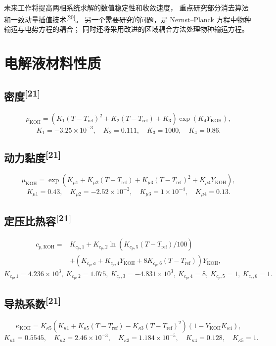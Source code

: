 \documentclass[UTF8,zihao=-4,fontset=fandol]{ctexart}
\begin{document}
未来工作将提高两相系统求解的数值稳定性和收敛速度，
重点研究部分消去算法和一致动量插值技术\textsuperscript{[20]}。
另一个需要研究的问题，是 Nernst--Planck 方程中物种输运与电势方程的耦合；
同时还将采用改进的区域耦合方法处理物种输运方程。

\appendix
\section{电解液材料性质}

\subsection{密度\textsuperscript{[21]}}
\[
\rho_{\mathrm{KOH}}=
\left(K_1(T-T_{\mathrm{ref}})^2+K_2(T-T_{\mathrm{ref}})+K_3\right)
\exp(K_4Y_{\mathrm{KOH}}),
\]
\[
K_1=-3.25\times10^{-3},\quad K_2=0.111,\quad K_3=1000,\quad K_4=0.86.
\]

\subsection{动力黏度\textsuperscript{[21]}}
\[
\mu_{\mathrm{KOH}}=
\exp\!\left(K_{\mu1}+K_{\mu2}(T-T_{\mathrm{ref}})
+K_{\mu3}(T-T_{\mathrm{ref}})^2+K_{\mu4}Y_{\mathrm{KOH}}\right),
\]
\[
K_{\mu1}=0.43,\quad K_{\mu2}=-2.52\times10^{-2},\quad
K_{\mu3}=1\times10^{-4},\quad K_{\mu4}=0.13.
\]

\subsection{定压比热容\textsuperscript{[21]}}
\begin{align*}
c_{p,\mathrm{KOH}}={}&K_{c_p,1}+K_{c_p,2}
\ln\!\left(K_{c_p,5}(T-T_{\mathrm{ref}})/100\right)\\
&+\left(K_{c_p,a}+K_{c_p,4}Y_{\mathrm{KOH}}
+8K_{c_p,6}(T-T_{\mathrm{ref}})\right)Y_{\mathrm{KOH}},
\end{align*}
\[
K_{c_p,1}=4.236\times10^3,\ K_{c_p,2}=1.075,\ K_{c_p,3}=-4.831\times10^3,\ 
K_{c_p,4}=8,\ K_{c_p,5}=1,\ K_{c_p,6}=1.
\]

\subsection{导热系数\textsuperscript{[21]}}
\[
\kappa_{\mathrm{KOH}}=
K_{\kappa5}\left(K_{\kappa1}+K_{\kappa5}(T-T_{\mathrm{ref}})
-K_{\kappa3}(T-T_{\mathrm{ref}})^2\right)
\left(1-Y_{\mathrm{KOH}}K_{\kappa4}\right),
\]
\[
K_{\kappa1}=0.5545,\quad K_{\kappa2}=2.46\times10^{-3},\quad
K_{\kappa3}=1.184\times10^{-5},\quad K_{\kappa4}=0.128,\quad K_{\kappa5}=1.
\]
\end{document}
